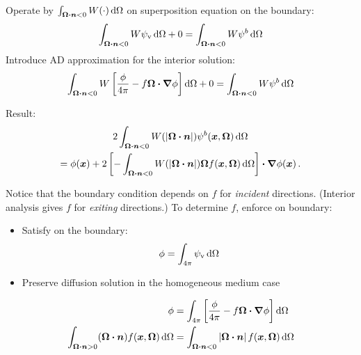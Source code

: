 \documentclass{beamer}
\newcommand{\psiv}{\psi_\mathrm{v}}
\begin{document}
\begin{frame}
  Operate by $\int_{\bm{\Omega}\bm{\cdot} \bm{n} < 0} W (\cdot) \mathop{}\!\mathrm{d}\Omega $ on
  superposition equation on the boundary:
  \begin{equation*}
\int_{\vec{\Omega}\vd \vec{n} < 0} W \psiv \ud\Omega + 0
= \int_{\vec{\Omega}\vd \vec{n} < 0} W \psi^b \ud\Omega
  \end{equation*}
  Introduce AD approximation for the interior solution:
  \begin{equation*}
    \int_{\bm{\Omega}\bm{\cdot} \bm{n} < 0} W \left[ \frac{\phi}{4\pi} -
      f \bm{\Omega}\bm{\cdot} \bm{\nabla} \phi \right] \mathop{}\!\mathrm{d}\Omega + 0
  = \int_{\bm{\Omega}\bm{\cdot} \bm{n} < 0} W \psi^b \mathop{}\!\mathrm{d}\Omega
  \end{equation*}

Result:
\begin{multline*}
2\int_{\bm{\Omega}\bm{\cdot}\bm{n} < 0} W(\left| \bm{\Omega}\bm{\cdot}\bm{n} \right|)
\psi^b(\bm{x},\bm{\Omega}) \mathop{}\!\mathrm{d}\Omega
\\
=
\phi(\bm{x})
+ 2 \left[ -\int_{\bm{\Omega}\bm{\cdot}\bm{n} < 0} W(\left| \bm{\Omega}\bm{\cdot}\bm{n} \right|)
\bm{\Omega} f(\bm{x}, \bm{\Omega}) \mathop{}\!\mathrm{d}\Omega\right] \bm{\cdot} \bm{\nabla} \phi(\bm{x})\,.
\end{multline*}
\end{frame}

\begin{frame}
  Notice that the boundary condition depends on $f$ for \emph{incident}
  directions. (Interior analysis gives $f$ for \emph{exiting} directions.) To
  determine $f$, enforce on boundary:
  \begin{itemize}
    \item Satisfy on the boundary:
      \begin{equation*}
        \phi = \int_{4\pi} \psiv \ud\Omega
      \end{equation*}
    \item Preserve diffusion solution in the homogeneous medium case
  \end{itemize}

  \begin{align*}
    \phi &= \int_{4\pi} \left[ \frac{\phi}{4\pi} -
      f \bm{\Omega}\bm{\cdot} \bm{\nabla} \phi \right] \mathop{}\!\mathrm{d}\Omega
    \\
  \int_{\bm{\Omega}\bm{\cdot}\bm{n} > 0} (\bm{\Omega}\bm{\cdot} \bm{n})
  f(\bm{x}, \bm{\Omega}) \mathop{}\!\mathrm{d}\Omega
  &=
  \int_{\bm{\Omega}\bm{\cdot}\bm{n} < 0} \left| \bm{\Omega}\bm{\cdot} \bm{n} \right|
  f(\bm{x}, \bm{\Omega}) \mathop{}\!\mathrm{d}\Omega
  \end{align*}
\end{frame}
\end{document}
